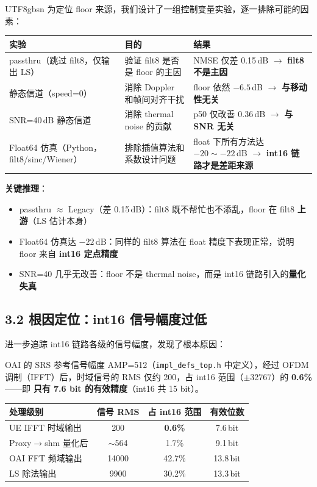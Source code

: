\documentclass[11pt,a4paper]{article}
\begin{document}
\begin{CJK}{UTF8}{gbsn}
为定位 floor 来源，我们设计了一组控制变量实验，逐一排除可能的因素：

\begin{table}[h]\centering
\begin{tabular}{p{4.5cm}p{3.5cm}p{5.5cm}}
\toprule
实验 & 目的 & 结果 \\
\midrule
passthru（跳过 filt8，仅输出 LS） & 验证 filt8 是否是 floor 的主因 & NMSE 仅差 0.15\,dB $\to$ \textbf{filt8 不是主因} \\
\addlinespace
静态信道（speed=0） & 消除 Doppler 和帧间对齐干扰 & floor 依然 $-6.5$\,dB $\to$ \textbf{与移动性无关} \\
\addlinespace
SNR=40\,dB 静态信道 & 消除 thermal noise 的贡献 & p50 仅改善 0.36\,dB $\to$ \textbf{与 SNR 无关} \\
\addlinespace
Float64 仿真（Python，filt8/sinc/Wiener） & 排除插值算法和系数设计问题 & float 下所有方法达 $-20\sim -22$\,dB $\to$ \textbf{int16 链路才是差距来源} \\
\bottomrule
\end{tabular}
\end{table}

\textbf{关键推理}：
\begin{itemize}[leftmargin=2em]
\item passthru $\approx$ Legacy（差 0.15\,dB）：filt8 既不帮忙也不添乱，floor 在 filt8 \textbf{上游}（LS 估计本身）
\item Float64 仿真达 $-22$\,dB：同样的 filt8 算法在 float 精度下表现正常，说明 floor 来自 \textbf{int16 定点精度}
\item SNR=40 几乎无改善：floor 不是 thermal noise，而是 int16 链路引入的\textbf{量化失真}
\end{itemize}

\subsection{3.2 根因定位：int16 信号幅度过低}

进一步追踪 int16 链路各级的信号幅度，发现了根本原因：

OAI 的 SRS 参考信号幅度 AMP=512（\texttt{impl\_defs\_top.h} 中定义），经过 OFDM 调制（IFFT）后，时域信号的 RMS 仅约 200，占 int16 范围（$\pm$32767）的 \textbf{0.6\%}——即 \textbf{只有 7.6 bit 的有效精度}（int16 共 15 bit）。

\begin{table}[h]\centering
\begin{tabular}{lccc}
\toprule
处理级别 & 信号 RMS & 占 int16 范围 & 有效位数 \\
\midrule
UE IFFT 时域输出 & 200 & \textbf{0.6\%} & 7.6\,bit \\
Proxy$\to$shm 量化后 & $\sim$564 & 1.7\% & 9.1\,bit \\
OAI FFT 频域输出 & 14000 & 42.7\% & 13.8\,bit \\
LS 除法输出 & 9900 & 30.2\% & 13.3\,bit \\
\bottomrule
\end{tabular}
\end{table}


\end{CJK}
\end{document}
